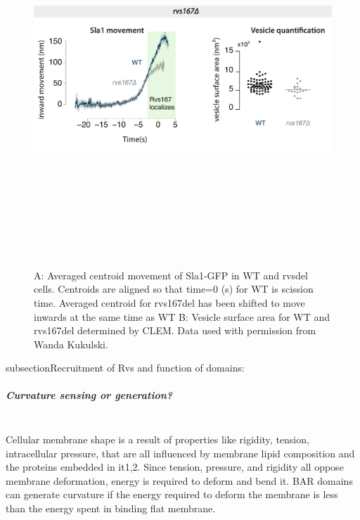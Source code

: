 \begin{figure}
\includegraphics[width=14cm,height=14cm,keepaspectratio, valign=t]{figures/results_final/rvsdeletion}
	\caption[some stuff]
{A: Averaged centroid movement of Sla1-GFP in WT and rvsdel cells. Centroids are aligned so that time=0 (s) for WT is scission time. Averaged centroid for rvs167del has been shifted to move inwards at the same time as WT B: Vesicle surface area for WT and rvs167del determined by CLEM. Data used with permission from Wanda Kukulski.
}
\end{figure}

subsection{Recruitment of Rvs and function of domains: } 

	\subparagraph{Curvature sensing or generation? }
	\mbox{}\\
	Cellular membrane shape is a result of properties like rigidity, tension, intracellular pressure, that are all influenced by membrane lipid composition and the proteins embedded in it1,2. Since tension, pressure, and rigidity all oppose membrane deformation, energy is required to deform and bend it. BAR domains can generate curvature if the energy required to deform the membrane is less than the energy spent in binding flat membrane.

\vspace{5mm}
			
